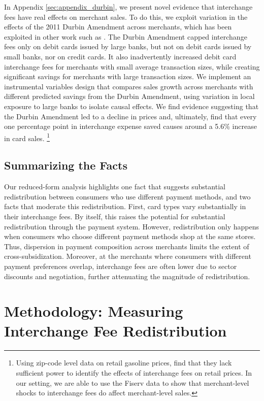 \documentclass[11pt,english]{article}
\theoremstyle{remark}
\begin{document}
In Appendix \ref{sec:appendix_durbin}, we present novel evidence that interchange fees have real effects on merchant sales. To do this, we exploit variation in the effects of the 2011 Durbin Amendment across merchants, which has been exploited in other work such as \citet{Mukharlyamov.Sarin2025}. The Durbin Amendment capped interchange fees only on debit cards issued by large banks, but not on debit cards issued by small banks, nor on credit cards. It also inadvertently increased debit card interchange fees for merchants with small average transaction sizes, while creating significant savings for merchants with large transaction sizes. We implement an instrumental variables design that compares sales growth across merchants with different predicted savings from the Durbin Amendment, using variation in local exposure to large banks to isolate causal effects. We find evidence suggesting that the Durbin Amendment led to a decline in prices and, ultimately, find that every one percentage point in interchange expense saved causes around a 5.6\% increase in card sales. \footnote{Using zip-code level data on retail gasoline prices, \citet{Mukharlyamov.Sarin2025} find that they lack sufficient power to identify the effects of interchange fees on retail prices. In our setting, we are able to use the Fiserv data to show that merchant-level shocks to interchange fees do affect merchant-level sales.}


\subsection{Summarizing the Facts}

Our reduced-form analysis highlights one fact that suggests substantial redistribution between consumers who use different payment methods, and two facts that moderate this redistribution. First, card types vary substantially in their interchange fees. By itself, this raises the potential for substantial redistribution through the payment system. However, redistribution only happens when consumers who choose different payment methods shop at the same stores. Thus, dispersion in payment composition across merchants limits the extent of cross-subsidization. Moreover, at the merchants where consumers with different payment preferences overlap, interchange fees are often lower due to sector discounts and negotiation, further attenuating the magnitude of redistribution.



\section{Methodology: Measuring Interchange Fee Redistribution}
\label{sec:redistribution}
\end{document}
